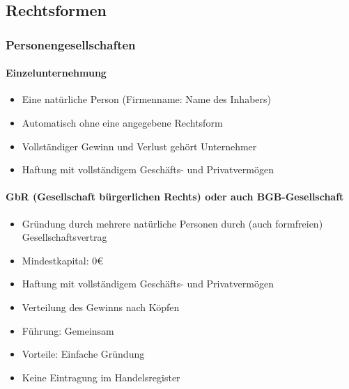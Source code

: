 \documentclass[titlepage,parskip=half]{scrartcl}
\begin{document}
\subsection{Rechtsformen}

\subsubsection{Personengesellschaften}
\paragraph{Einzelunternehmung}
\begin{itemize}
    \item Eine natürliche Person (Firmenname: Name des Inhabers)
    \item Automatisch ohne eine angegebene Rechtsform
    \item Vollständiger Gewinn und Verlust gehört Unternehmer
    \item Haftung mit vollständigem Geschäfts- und Privatvermögen
\end{itemize}

\paragraph{GbR (Gesellschaft bürgerlichen Rechts) oder auch BGB-Gesellschaft}
\begin{itemize}
    \item Gründung durch mehrere natürliche Personen durch (auch formfreien) Gesellschaftsvertrag
    \item Mindestkapital: 0€
    \item Haftung mit vollständigem Geschäfts- und Privatvermögen
    \item Verteilung des Gewinns nach Köpfen
    \item Führung: Gemeinsam
    \item Vorteile: Einfache Gründung
    \item Keine Eintragung im Handelsregister
\end{itemize}
\end{document}
